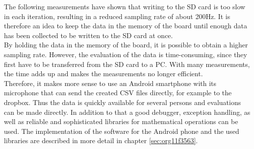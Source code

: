 The following measurements have shown that writing to the SD card is too slow in each iteration, resulting in a reduced sampling rate of about 200Hz. It is therefore an idea to keep the data in the memory of the board until enough data has been collected to be written to the SD card at once. 
\\
By holding the data in the memory of the board, it is possible to obtain a higher sampling rate. However, the evaluation of the data is time-consuming, since they first have to be transferred from the SD card to a PC. With many measurements, the time adds up and makes the measurements no longer efficient. \\
Therefore, it makes more sense to use an Android smartphone with its microphone that can send the created CSV files directly, for example to the dropbox. Thus the data is quickly available for several persons and evaluations can be made directly. In addition to that a good debugger, exception handling, as well as reliable and sophisticated libraries for mathematical operations can be used. The implementation of the software for the Android phone and the used libraries are described in more detail in chapter \ref{sec:org11f3563}.
